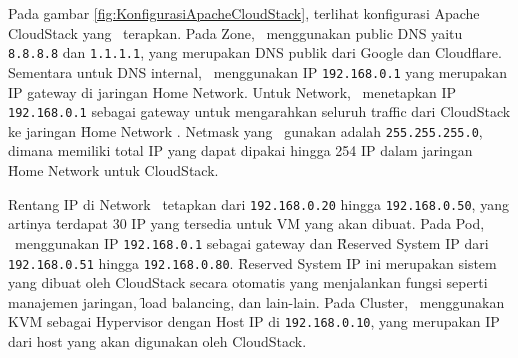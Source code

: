 
Pada gambar \ref{fig:KonfigurasiApacheCloudStack}, terlihat konfigurasi Apache CloudStack yang \saya\ terapkan. Pada Zone, \saya\ menggunakan public DNS yaitu \texttt{8.8.8.8} dan \texttt{1.1.1.1}, yang merupakan DNS publik dari Google dan Cloudflare. Sementara untuk DNS internal, \saya\ menggunakan IP \texttt{192.168.0.1} yang merupakan IP gateway di jaringan Home Network. Untuk Network, \saya\ menetapkan IP \texttt{192.168.0.1} sebagai gateway untuk mengarahkan seluruh traffic dari CloudStack ke jaringan \f{Home Network} \saya. Netmask yang \saya\ gunakan adalah \texttt{255.255.255.0}, dimana memiliki total IP yang dapat dipakai hingga 254 IP dalam jaringan \f{Home Network} untuk CloudStack.

Rentang IP di Network \saya\ tetapkan dari \texttt{192.168.0.20} hingga \texttt{192.168.0.50}, yang artinya terdapat 30 IP yang tersedia untuk VM yang akan dibuat. Pada Pod, \saya\ menggunakan IP \texttt{192.168.0.1} sebagai gateway dan \f{Reserved System IP} dari \texttt{192.168.0.51} hingga \texttt{192.168.0.80}. \f{Reserved System IP} ini merupakan sistem yang dibuat oleh CloudStack secara otomatis yang menjalankan fungsi seperti manajemen jaringan, \f{load balancing}, dan lain-lain. Pada Cluster, \saya\ menggunakan KVM sebagai Hypervisor dengan Host IP di \texttt{192.168.0.10}, yang merupakan IP dari host yang akan digunakan oleh CloudStack.

